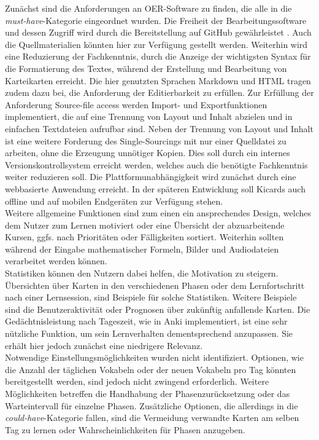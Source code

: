 Zunächst sind die Anforderungen an OER-Software zu finden, die alle in die \emph{must-have}-Kategorie eingeordnet wurden. 
Die Freiheit der Bearbeitungssoftware und dessen Zugriff wird durch die Bereitstellung auf GitHub gewährleistet \cite{kicards}. Auch die Quellmaterialien könnten hier zur Verfügung gestellt werden. 
Weiterhin wird eine Reduzierung der Fachkenntnis, durch die Anzeige der wichtigsten Syntax für die Formatierung des Textes, während der Erstellung und Bearbeitung von Karteikarten erreicht. Die hier genutzten Sprachen Markdown und HTML tragen zudem dazu bei, die Anforderung der Editierbarkeit zu erfüllen.
Zur Erfüllung der Anforderung \glqq Source-file access\grqq{} werden Import- und Exportfunktionen implementiert, die auf eine Trennung von Layout und Inhalt abzielen und in einfachen Textdateien aufrufbar sind. 
Neben der Trennung von Layout und Inhalt ist eine weitere Forderung des Single-Sourcings mit nur einer Quelldatei zu arbeiten, ohne die Erzeugung unnötiger Kopien. Dies soll durch ein internes Versionskontrollsystem erreicht werden, welches auch die benötigte Fachkenntnis weiter reduzieren soll. 
Die Plattformunabhängigkeit wird zunächst durch eine webbasierte Anwendung erreicht. In der späteren Entwicklung soll Kicards auch offline und auf mobilen Endgeräten zur Verfügung stehen. \\

Weitere allgemeine Funktionen sind zum einen ein ansprechendes Design, welches dem Nutzer zum Lernen motiviert oder eine Übersicht der abzuarbeitende Kursen, ggfs. nach Prioritäten oder Fälligkeiten sortiert. Weiterhin sollten während der Eingabe mathematischer Formeln, Bilder und Audiodateien verarbeitet werden können. \\

Statistiken können den Nutzern dabei helfen, die Motivation zu steigern. Übersichten über Karten in den verschiedenen Phasen oder dem Lernfortschritt nach einer Lernsession, sind Beispiele für solche Statistiken. Weitere Beispiele sind die Benutzeraktivität oder Prognosen über zukünftig anfallende Karten. Die Gedächtnisleistung nach Tageszeit, wie in Anki implementiert, ist eine sehr nützliche Funktion, um sein Lernverhalten dementsprechend anzupassen. Sie erhält hier jedoch zunächst eine niedrigere Relevanz. \\

Notwendige Einstellungsmöglichkeiten wurden nicht identifiziert. Optionen, wie die Anzahl der täglichen Vokabeln oder der neuen Vokabeln pro Tag könnten bereitgestellt werden, sind jedoch nicht zwingend erforderlich. Weitere Möglichkeiten betreffen die Handhabung der Phasenzurücksetzung oder das Warteintervall für einzelne Phasen. Zusätzliche Optionen, die allerdings in die \emph{could-have}-Kategorie fallen, sind die Vermeidung verwandte Karten am selben Tag zu lernen oder Wahrscheinlichkeiten für Phasen anzugeben. 

